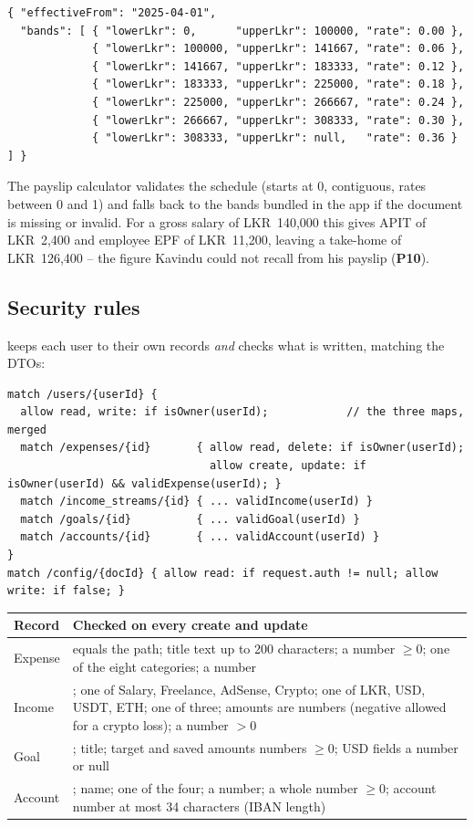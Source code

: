 \documentclass[11pt,a4paper]{article}
\newcommand{\prob}[1]{\textsf{\textbf{\color{pfamberdark}#1}}}
\newcommand{\lkr}[1]{LKR~#1}
\begin{document}
\begin{lstlisting}
{ "effectiveFrom": "2025-04-01",
  "bands": [ { "lowerLkr": 0,      "upperLkr": 100000, "rate": 0.00 },
             { "lowerLkr": 100000, "upperLkr": 141667, "rate": 0.06 },
             { "lowerLkr": 141667, "upperLkr": 183333, "rate": 0.12 },
             { "lowerLkr": 183333, "upperLkr": 225000, "rate": 0.18 },
             { "lowerLkr": 225000, "upperLkr": 266667, "rate": 0.24 },
             { "lowerLkr": 266667, "upperLkr": 308333, "rate": 0.30 },
             { "lowerLkr": 308333, "upperLkr": null,   "rate": 0.36 } ] }
\end{lstlisting}
The payslip calculator validates the schedule (starts at 0, contiguous, rates between 0 and 1) and falls back to the bands bundled in the app if the document is missing or invalid. For a gross salary of \lkr{140,000} this gives APIT of \lkr{2,400} and employee EPF of \lkr{11,200}, leaving a take-home of \lkr{126,400} -- the figure Kavindu could not recall from his payslip (\prob{P10}).

\subsection{Security rules}
 keeps each user to their own records \emph{and} checks what is written, matching the DTOs:
\begin{lstlisting}
match /users/{userId} {
  allow read, write: if isOwner(userId);            // the three maps, merged
  match /expenses/{id}       { allow read, delete: if isOwner(userId);
                               allow create, update: if isOwner(userId) && validExpense(userId); }
  match /income_streams/{id} { ... validIncome(userId) }
  match /goals/{id}          { ... validGoal(userId) }
  match /accounts/{id}       { ... validAccount(userId) }
}
match /config/{docId} { allow read: if request.auth != null; allow write: if false; }
\end{lstlisting}

\begin{tabularx}{\textwidth}{|>{\raggedright\arraybackslash}p{2.2cm}|L|}
\hline
\textbf{Record} & \textbf{Checked on every create and update}\\
\hline
Expense &  equals the path; title text up to 200 characters;  a number $\geq 0$;  one of the eight categories;  a number\\
Income & ;  one of Salary, Freelance, AdSense, Crypto;  one of LKR, USD, USDT, ETH;  one of three; amounts are numbers (negative allowed for a crypto loss);  a number $> 0$\\
Goal & ; title; target and saved amounts numbers $\geq 0$; USD fields a number or null\\
Account & ; name;  one of the four;  a number;  a whole number $\geq 0$; account number at most 34 characters (IBAN length)\\
\hline
\end{tabularx}
\end{document}
